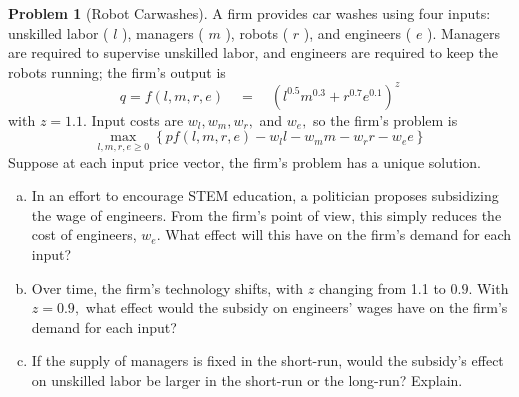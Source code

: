 \documentclass{article}
\theoremstyle{definition}
\newtheorem{problem}{Problem}
\begin{document}
\begin{problem}[Robot Carwashes]
A firm provides car washes using four inputs: unskilled labor ( $l$ ), managers ( $m$ ), robots ( $r$ ), and engineers ( $e$ ). Managers are required to supervise unskilled labor, and engineers are required to keep the robots running; the firm's output is
$$
q=f(l, m, r, e) \quad=\quad\left(l^{0.5} m^{0.3}+r^{0.7} e^{0.1}\right)^{z}
$$
with $z=1.1 .$ Input costs are $w_{l}, w_{m}, w_{r},$ and $w_{e},$ so the firm's problem is
$$
\max _{l, m, r, e \geq 0}\left\{p f(l, m, r, e)-w_{l} l-w_{m} m-w_{r} r-w_{e} e\right\}
$$
Suppose at each input price vector, the firm's problem has a unique solution.
\begin{enumerate}[(a)]
    \item In an effort to encourage STEM education, a politician proposes subsidizing the wage of engineers. From the firm's point of view, this simply reduces the cost of engineers, $w_{e} .$ What effect will this have on the firm's demand for each input?
    \item Over time, the firm's technology shifts, with $z$ changing from 1.1 to $0.9 .$ With $z=0.9,$ what effect would the subsidy on engineers' wages have on the firm's demand for each input?
    \item If the supply of managers is fixed in the short-run, would the subsidy's effect on unskilled labor be larger in the short-run or the long-run? Explain.
\end{enumerate}
\end{problem}
\end{document}
